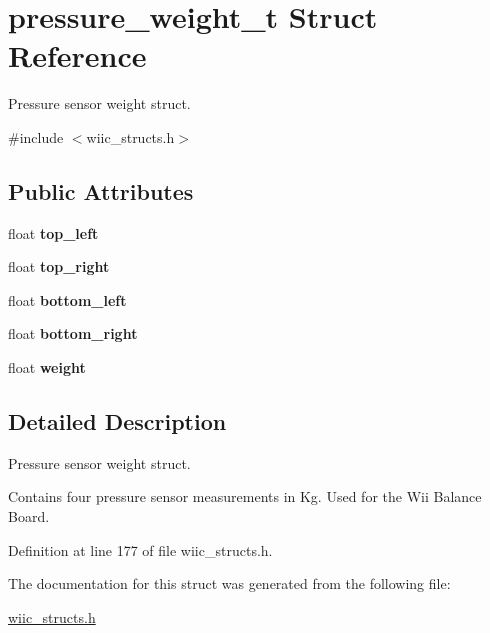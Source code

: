 \hypertarget{structpressure__weight__t}{\section{pressure\-\_\-weight\-\_\-t \-Struct \-Reference}
\label{structpressure__weight__t}
}


\-Pressure sensor weight struct.  




{\ttfamily \#include $<$wiic\-\_\-structs.\-h$>$}

\subsection*{\-Public \-Attributes}
\begin{DoxyCompactItemize}
\item 
\hypertarget{structpressure__weight__t_a4603611d0fdb9b80e4465f798f78a24d}{float {\bfseries top\-\_\-left}}\label{structpressure__weight__t_a4603611d0fdb9b80e4465f798f78a24d}

\item 
\hypertarget{structpressure__weight__t_a9821f4d6ef40b6a796d9dd58f95cc987}{float {\bfseries top\-\_\-right}}\label{structpressure__weight__t_a9821f4d6ef40b6a796d9dd58f95cc987}

\item 
\hypertarget{structpressure__weight__t_aadd0292e24dfbfed6d62050447d7496d}{float {\bfseries bottom\-\_\-left}}\label{structpressure__weight__t_aadd0292e24dfbfed6d62050447d7496d}

\item 
\hypertarget{structpressure__weight__t_a50f211934ff8139f85ba41c71834be9a}{float {\bfseries bottom\-\_\-right}}\label{structpressure__weight__t_a50f211934ff8139f85ba41c71834be9a}

\item 
\hypertarget{structpressure__weight__t_ab35b28c2c97cff296b9e94d327dd2097}{float {\bfseries weight}}\label{structpressure__weight__t_ab35b28c2c97cff296b9e94d327dd2097}

\end{DoxyCompactItemize}


\subsection{\-Detailed \-Description}
\-Pressure sensor weight struct. 

\-Contains four pressure sensor measurements in \-Kg. \-Used for the \-Wii \-Balance \-Board. 

\-Definition at line 177 of file wiic\-\_\-structs.\-h.



\-The documentation for this struct was generated from the following file\-:\begin{DoxyCompactItemize}
\item 
\hyperlink{wiic__structs_8h}{wiic\-\_\-structs.\-h}\end{DoxyCompactItemize}
